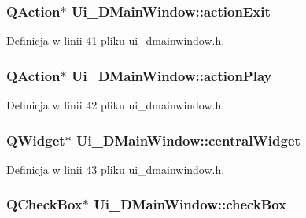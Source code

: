 \hypertarget{class_ui___d_main_window_ae1fa62a4d27fa0f4a5c63c7c60cfdad2}{}
\subsubsection[{action\+Exit}]{\setlength{\rightskip}{0pt plus 5cm}Q\+Action$\ast$ Ui\+\_\+\+D\+Main\+Window\+::action\+Exit}\label{class_ui___d_main_window_ae1fa62a4d27fa0f4a5c63c7c60cfdad2}


Definicja w linii 41 pliku ui\+\_\+dmainwindow.\+h.

\hypertarget{class_ui___d_main_window_a6cfb6311ca1dd6e247d80255e2667ba7}{}
\subsubsection[{action\+Play}]{\setlength{\rightskip}{0pt plus 5cm}Q\+Action$\ast$ Ui\+\_\+\+D\+Main\+Window\+::action\+Play}\label{class_ui___d_main_window_a6cfb6311ca1dd6e247d80255e2667ba7}


Definicja w linii 42 pliku ui\+\_\+dmainwindow.\+h.

\hypertarget{class_ui___d_main_window_a94cf40cb4e645cfa2e80f36ffbf5018e}{}
\subsubsection[{central\+Widget}]{\setlength{\rightskip}{0pt plus 5cm}Q\+Widget$\ast$ Ui\+\_\+\+D\+Main\+Window\+::central\+Widget}\label{class_ui___d_main_window_a94cf40cb4e645cfa2e80f36ffbf5018e}


Definicja w linii 43 pliku ui\+\_\+dmainwindow.\+h.

\hypertarget{class_ui___d_main_window_a41e765e074811602fbc5efecf07011ac}{}
\subsubsection[{check\+Box}]{\setlength{\rightskip}{0pt plus 5cm}Q\+Check\+Box$\ast$ Ui\+\_\+\+D\+Main\+Window\+::check\+Box}\label{class_ui___d_main_window_a41e765e074811602fbc5efecf07011ac}


